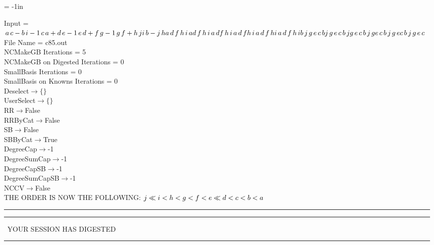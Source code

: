 \voffset = -1in
\evensidemargin 0.1in
\oddsidemargin 0.1in
\textheight 9in
\textwidth 6in

\normalsize
\baselineskip=12pt
\noindent
Input = 
$
\\a\,
 c - b\,
 i\\
-1\,
 c\,
 a + d\,
 e\\
-1\,
 e\,
 d + f\,
 g\\
-1\,
 g\,
 f + h\,
 j\\
i\,
 b - j\,
 h\\
a\,
 d\,
 f\,
 h\,
 i\,
 a\\
d\,
 f\,
 h\,
 i\,
 a\,
 d\\
f\,
 h\,
 i\,
 a\,
 d\,
 f\\
h\,
 i\,
 a\,
 d\,
 f\,
 h\\
i\,
 a\,
 d\,
 f\,
 h\,
 i\\
b\,
 j\,
 g\,
 e\,
 c\,
 b\\
j\,
 g\,
 e\,
 c\,
 b\,
 j\\
g\,
 e\,
 c\,
 b\,
 j\,
 g\\
e\,
 c\,
 b\,
 j\,
 g\,
 e\\
c\,
 b\,
 j\,
 g\,
 e\,
 c\\
$
File Name = c85.out\\
NCMakeGB Iterations = 5\\
NCMakeGB on Digested Iterations = 0\\
SmallBasis Iterations = 0\\
SmallBasis on Knowns Iterations = 0\\
Deselect$\rightarrow \{\}$\\
UserSelect$\rightarrow \{\}$\\
RR$\rightarrow $False\\
RRByCat$\rightarrow $False\\
SB$\rightarrow $False\\
SBByCat$\rightarrow $True\\
DegreeCap$\rightarrow $-1\\
DegreeSumCap$\rightarrow $-1\\
DegreeCapSB$\rightarrow $-1\\
DegreeSumCapSB$\rightarrow $-1\\
NCCV$\rightarrow $False\\
THE ORDER IS NOW THE FOLLOWING:\hfil\break
$
j\ll
i<h<g<f<e\ll
d<c<b<a\\
$
\rule[2pt]{6in}{4pt}\hfil\break
\rule[2pt]{1.879in}{4pt}
\ YOUR SESSION HAS DIGESTED\ 
\rule[2pt]{1.879in}{4pt}\hfil\break
